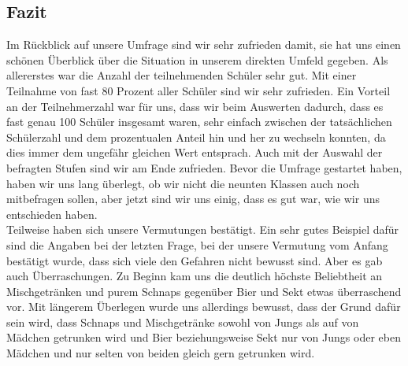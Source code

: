 \documentclass[12pt]{article}
\begin{document}
\subsection{Fazit}
Im Rückblick auf unsere Umfrage sind wir sehr zufrieden damit, sie hat uns einen schönen Überblick über die Situation in unserem direkten Umfeld gegeben. Als allererstes war die Anzahl der teilnehmenden Schüler sehr gut. Mit einer Teilnahme von fast 80 Prozent aller Schüler sind wir sehr zufrieden. Ein Vorteil an der Teilnehmerzahl war für uns, dass wir beim Auswerten dadurch, dass es fast genau 100 Schüler insgesamt waren, sehr einfach zwischen der tatsächlichen Schülerzahl und dem prozentualen Anteil hin und her zu wechseln konnten, da dies immer dem ungefähr gleichen Wert entsprach. Auch mit der Auswahl der befragten Stufen sind wir am Ende zufrieden. Bevor die Umfrage gestartet haben, haben wir uns lang überlegt, ob wir nicht die neunten Klassen auch noch mitbefragen sollen, aber jetzt sind wir uns einig, dass es gut war, wie wir uns entschieden haben.\\
Teilweise haben sich unsere Vermutungen bestätigt. Ein sehr gutes Beispiel dafür sind die Angaben bei der letzten Frage, bei der unsere Vermutung vom Anfang bestätigt wurde, dass sich viele den Gefahren nicht bewusst sind. Aber es gab auch Überraschungen. Zu Beginn kam uns die deutlich höchste Beliebtheit an Mischgetränken und purem Schnaps gegenüber Bier und Sekt etwas überraschend vor. Mit längerem Überlegen wurde uns allerdings bewusst, dass der Grund dafür sein wird, dass Schnaps und Mischgetränke sowohl von Jungs als auf von Mädchen getrunken wird und Bier beziehungsweise Sekt nur von Jungs oder eben Mädchen und nur selten von beiden gleich gern getrunken wird.\\ 
\end{document}
